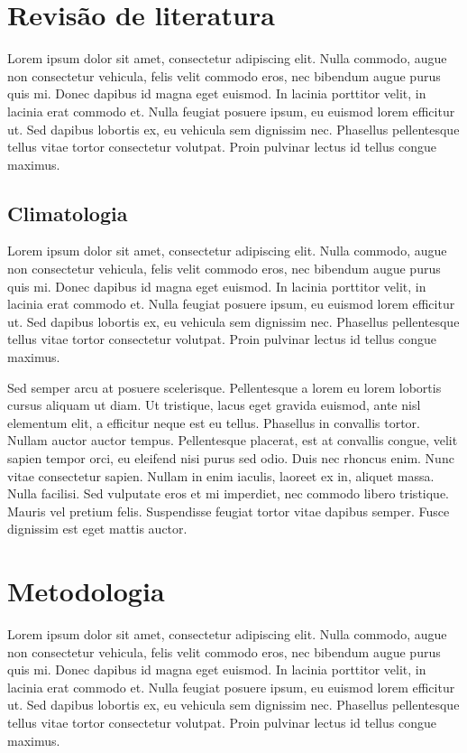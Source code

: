 \documentclass[brazil,hardcopy,openany,a4paper]{_ufscthesis}
\begin{document}
\chapter{Revisão de literatura}
	
	Lorem ipsum dolor sit amet, consectetur adipiscing elit. Nulla commodo, augue non consectetur vehicula, felis velit commodo eros, nec bibendum augue purus quis mi. Donec dapibus id magna eget euismod. In lacinia porttitor velit, in lacinia erat commodo et. Nulla feugiat posuere ipsum, eu euismod lorem efficitur ut. Sed dapibus lobortis ex, eu vehicula sem dignissim nec. Phasellus pellentesque tellus vitae tortor consectetur volutpat. Proin pulvinar lectus id tellus congue maximus.
	
	
	\section{Climatologia}
	
	Lorem ipsum dolor sit amet, consectetur adipiscing elit. Nulla commodo, augue non consectetur vehicula, felis velit commodo eros, nec bibendum augue purus quis mi. Donec dapibus id magna eget euismod. In lacinia porttitor velit, in lacinia erat commodo et. Nulla feugiat posuere ipsum, eu euismod lorem efficitur ut. Sed dapibus lobortis ex, eu vehicula sem dignissim nec. Phasellus pellentesque tellus vitae tortor consectetur volutpat. Proin pulvinar lectus id tellus congue maximus.

	Sed semper arcu at posuere scelerisque. Pellentesque a lorem eu lorem lobortis cursus aliquam ut diam. Ut tristique, lacus eget gravida euismod, ante nisl elementum elit, a efficitur neque est eu tellus. Phasellus in convallis tortor. Nullam auctor auctor tempus. Pellentesque placerat, est at convallis congue, velit sapien tempor orci, eu eleifend nisi purus sed odio. Duis nec rhoncus enim. Nunc vitae consectetur sapien. Nullam in enim iaculis, laoreet ex in, aliquet massa. Nulla facilisi. Sed vulputate eros et mi imperdiet, nec commodo libero tristique. Mauris vel pretium felis. Suspendisse feugiat tortor vitae dapibus semper. Fusce dignissim est eget mattis auctor.
	
		\chapter{Metodologia}
		\label{chapter:metodologia}

	Lorem ipsum dolor sit amet, consectetur adipiscing elit. Nulla commodo, augue non consectetur vehicula, felis velit commodo eros, nec bibendum augue purus quis mi. Donec dapibus id magna eget euismod. In lacinia porttitor velit, in lacinia erat commodo et. Nulla feugiat posuere ipsum, eu euismod lorem efficitur ut. Sed dapibus lobortis ex, eu vehicula sem dignissim nec. Phasellus pellentesque tellus vitae tortor consectetur volutpat. Proin pulvinar lectus id tellus congue maximus.
\end{document}
